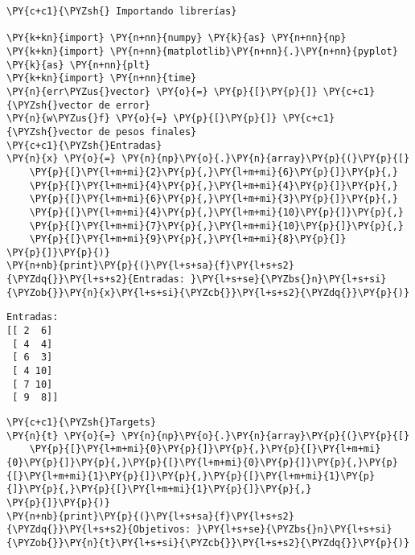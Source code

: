

    
\begin{tcolorbox}[breakable, size=fbox, boxrule=1pt, pad at break*=1mm,colback=cellbackground, colframe=cellborder]
\begin{Verbatim}[commandchars=\\\{\}]
\PY{c+c1}{\PYZsh{} Importando librerías}

\PY{k+kn}{import} \PY{n+nn}{numpy} \PY{k}{as} \PY{n+nn}{np}
\PY{k+kn}{import} \PY{n+nn}{matplotlib}\PY{n+nn}{.}\PY{n+nn}{pyplot} \PY{k}{as} \PY{n+nn}{plt}
\PY{k+kn}{import} \PY{n+nn}{time}
\PY{n}{err\PYZus{}vector} \PY{o}{=} \PY{p}{[}\PY{p}{]} \PY{c+c1}{\PYZsh{}vector de error}
\PY{n}{w\PYZus{}f} \PY{o}{=} \PY{p}{[}\PY{p}{]} \PY{c+c1}{\PYZsh{}vector de pesos finales}
\PY{c+c1}{\PYZsh{}Entradas}
\PY{n}{x} \PY{o}{=} \PY{n}{np}\PY{o}{.}\PY{n}{array}\PY{p}{(}\PY{p}{[}
    \PY{p}{[}\PY{l+m+mi}{2}\PY{p}{,}\PY{l+m+mi}{6}\PY{p}{]}\PY{p}{,}
    \PY{p}{[}\PY{l+m+mi}{4}\PY{p}{,}\PY{l+m+mi}{4}\PY{p}{]}\PY{p}{,}
    \PY{p}{[}\PY{l+m+mi}{6}\PY{p}{,}\PY{l+m+mi}{3}\PY{p}{]}\PY{p}{,}
    \PY{p}{[}\PY{l+m+mi}{4}\PY{p}{,}\PY{l+m+mi}{10}\PY{p}{]}\PY{p}{,}
    \PY{p}{[}\PY{l+m+mi}{7}\PY{p}{,}\PY{l+m+mi}{10}\PY{p}{]}\PY{p}{,}
    \PY{p}{[}\PY{l+m+mi}{9}\PY{p}{,}\PY{l+m+mi}{8}\PY{p}{]}
\PY{p}{]}\PY{p}{)}
\PY{n+nb}{print}\PY{p}{(}\PY{l+s+sa}{f}\PY{l+s+s2}{\PYZdq{}}\PY{l+s+s2}{Entradas: }\PY{l+s+se}{\PYZbs{}n}\PY{l+s+si}{\PYZob{}}\PY{n}{x}\PY{l+s+si}{\PYZcb{}}\PY{l+s+s2}{\PYZdq{}}\PY{p}{)}
\end{Verbatim}
\end{tcolorbox}

    \begin{Verbatim}[commandchars=\\\{\}]
Entradas:
[[ 2  6]
 [ 4  4]
 [ 6  3]
 [ 4 10]
 [ 7 10]
 [ 9  8]]
    \end{Verbatim}

    \begin{tcolorbox}[breakable, size=fbox, boxrule=1pt, pad at break*=1mm,colback=cellbackground, colframe=cellborder]
\begin{Verbatim}[commandchars=\\\{\}]
\PY{c+c1}{\PYZsh{}Targets}
\PY{n}{t} \PY{o}{=} \PY{n}{np}\PY{o}{.}\PY{n}{array}\PY{p}{(}\PY{p}{[}
    \PY{p}{[}\PY{l+m+mi}{0}\PY{p}{]}\PY{p}{,}\PY{p}{[}\PY{l+m+mi}{0}\PY{p}{]}\PY{p}{,}\PY{p}{[}\PY{l+m+mi}{0}\PY{p}{]}\PY{p}{,}\PY{p}{[}\PY{l+m+mi}{1}\PY{p}{]}\PY{p}{,}\PY{p}{[}\PY{l+m+mi}{1}\PY{p}{]}\PY{p}{,}\PY{p}{[}\PY{l+m+mi}{1}\PY{p}{]}\PY{p}{,}
\PY{p}{]}\PY{p}{)}
\PY{n+nb}{print}\PY{p}{(}\PY{l+s+sa}{f}\PY{l+s+s2}{\PYZdq{}}\PY{l+s+s2}{Objetivos: }\PY{l+s+se}{\PYZbs{}n}\PY{l+s+si}{\PYZob{}}\PY{n}{t}\PY{l+s+si}{\PYZcb{}}\PY{l+s+s2}{\PYZdq{}}\PY{p}{)}
\end{Verbatim}
\end{tcolorbox}

